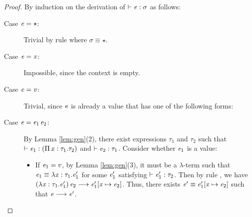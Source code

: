 \begin{proof}
    By induction on the derivation of $\vdash  \mathit{e}  :  \sigma$ as follows:
    \begin{description}
        \item[Case $\mathit{e}  =  \star$:] Trivial by rule  where $\sigma  \equiv  \star$.
        \item[Case $\mathit{e}  =  \mathit{x}$:] Impossible, since the context is empty.
        \item[Case $\mathit{e}  =  \mathit{v}$:] Trivial, since $\mathit{e}$ is already a value that has one of the following forms:
		\begin{inparaenum}[(1)]
			\item $\lambda  \ottmv{x}  \ottsym{:}  \tau  \ottsym{.}  \ottnt{e}$,
			\item $\Pi \, \ottmv{x}  \ottsym{:}  \tau_{{\mathrm{1}}}  \ottsym{.}  \tau_{{\mathrm{2}}}$,
			\item $\kw{cast}^{\uparrow} \, \ottsym{[}  \tau  \ottsym{]}  \ottnt{e}$.
		\end{inparaenum}
		\item[Case $\mathit{e}=\mathit{e_{{\mathrm{1}}}} \, \mathit{e_{{\mathrm{2}}}}$:] By Lemma \ref{lem:gen}(2), there exist expressions $\tau_{{\mathrm{1}}}$ and $\tau_{{\mathrm{2}}}$ such that $\vdash  \mathit{e_{{\mathrm{1}}}}  :  (  \Pi \, \mathit{x}  :  \tau_{{\mathrm{1}}}  .  \tau_{{\mathrm{2}}}  )$ and $\vdash  \mathit{e_{{\mathrm{2}}}}  :  \tau_{{\mathrm{1}}}$. Consider whether $\mathit{e_{{\mathrm{1}}}}$ is a value:
    		\begin{itemize}
    		    \item If $\mathit{e_{{\mathrm{1}}}}=v$, by Lemma \ref{lem:gen}(3), it must be a $\lambda$-term such that $\mathit{e_{{\mathrm{1}}}}  \equiv  \lambda  \mathit{x}  :  \tau_{{\mathrm{1}}}  .  \mathit{e'_{{\mathrm{1}}}}$ for some $\mathit{e'_{{\mathrm{1}}}}$ satisfying $\vdash  \mathit{e'_{{\mathrm{1}}}}  :  \tau_{{\mathrm{2}}}$. Then by rule , we have $(  \lambda  \mathit{x}  :  \tau_{{\mathrm{1}}}  .  \mathit{e'_{{\mathrm{1}}}}  ) \, \mathit{e_{{\mathrm{2}}}}  \longrightarrow  \mathit{e'_{{\mathrm{1}}}}  [  \mathit{x}  \mapsto  \mathit{e_{{\mathrm{2}}}}  ]$. Thus, there exists $\mathit{e'}  \equiv  \mathit{e'_{{\mathrm{1}}}}  [  \mathit{x}  \mapsto  \mathit{e_{{\mathrm{2}}}}  ]$ such that $\mathit{e}  \longrightarrow  \mathit{e'}$.

\end{itemize}
\end{description}
\end{proof}
